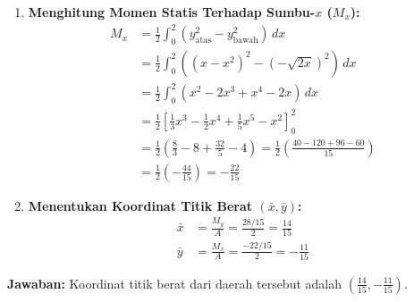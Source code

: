 \documentclass[11pt,a4paper]{article}
\begin{document}
\begin{enumerate}
  \item \textbf{Menghitung Momen Statis Terhadap Sumbu-$x$ ($M_x$):}
  \begin{align*}
    M_x &= \frac{1}{2}\int_{0}^{2} \left( y_{\text{atas}}^2 - y_{\text{bawah}}^2 \right) \, dx \\
    &= \frac{1}{2}\int_{0}^{2} \left( (x-x^2)^2 - (-\sqrt{2x})^2 \right) \, dx \\
    &= \frac{1}{2}\int_{0}^{2} (x^2 - 2x^3 + x^4 - 2x) \, dx \\
    &= \frac{1}{2}\left[ \frac{1}{3}x^3 - \frac{1}{2}x^4 + \frac{1}{5}x^5 - x^2 \right]_{0}^{2} \\
    &= \frac{1}{2}\left( \frac{8}{3} - 8 + \frac{32}{5} - 4 \right) = \frac{1}{2}\left( \frac{40 - 120 + 96 - 60}{15} \right) \\
    &= \frac{1}{2}\left( -\frac{44}{15} \right) = -\frac{22}{15}
  \end{align*}

  \item \textbf{Menentukan Koordinat Titik Berat $(\bar{x}, \bar{y})$:}
  \begin{align*}
    \bar{x} &= \frac{M_y}{A} = \frac{28/15}{2} = \frac{14}{15} \\
    \bar{y} &= \frac{M_x}{A} = \frac{-22/15}{2} = -\frac{11}{15}
  \end{align*}
\end{enumerate}
\textbf{Jawaban:} Koordinat titik berat dari daerah tersebut adalah \textbf{$\left(\frac{14}{15}, -\frac{11}{15}\right)$}.
\end{document}
